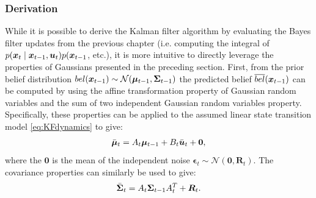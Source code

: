 \subsubsection{Derivation}
While it is possible to derive the Kalman filter algorithm by evaluating the Bayes filter updates from the previous chapter (i.e. computing the integral of $p(\bm{x}_t \mid \bm{x}_{t-1}, \bm{u}_t) p(\bm{x}_{t-1}$, etc.), it is more intuitive to directly leverage the properties of Gaussians presented in the preceding section. First, from the prior belief distribution $bel(\bm{x}_{t-1}) \sim \mathcal{N}(\bm{\mu}_{t-1},\bm{\Sigma}_{t-1})$ the predicted belief $\overline{bel}(\bm{x}_{t-1})$ can be computed by using the affine transformation property of Gaussian random variables and the sum of two independent Gaussian random variables property. Specifically, these properties can be applied to the assumed linear state transition model \eqref{eq:KFdynamics} to give:
\begin{equation*}
\begin{split}
\bar{\bm{\mu}}_t &= A_t \bm{\mu}_{t-1} + B_t\bar{\bm{u}}_t + \bm{0}, \\
\end{split}
\end{equation*}
where the $\bm{0}$ is the mean of the independent noise $\bm{\epsilon}_t \sim \mathcal{N}(\bm{0},\bm{R}_t)$. The covariance properties can similarly be used to give:
\begin{equation*}
\begin{split}
\bar{\bm{\Sigma}}_t &= A_t \bm{\Sigma}_{t-1}A_t^T + \bm{R}_t. \\
\end{split}
\end{equation*}

